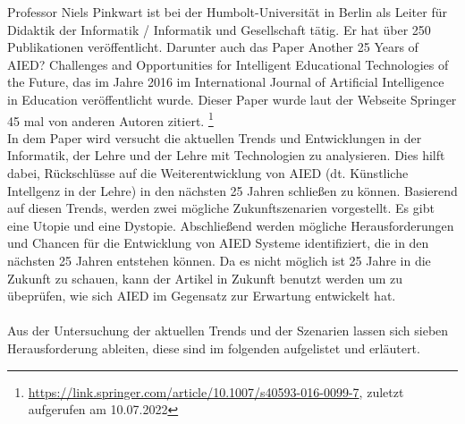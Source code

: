 
Professor Niels Pinkwart ist bei der Humbolt-Universität in Berlin als Leiter für \glqq{}Didaktik der Informatik / Informatik und Gesellschaft\grqq{} tätig.
Er hat über 250 Publikationen veröffentlicht. Darunter auch das Paper \glqq{}Another 25 Years of AIED? Challenges and Opportunities for Intelligent Educational Technologies of the Future\grqq{}, das im Jahre 2016 im \glqq International Journal of Artificial Intelligence in Education\grqq{} veröffentlicht wurde.
Dieser Paper wurde laut der Webseite Springer 45 mal von anderen Autoren zitiert. \footnote{\url{https://link.springer.com/article/10.1007/s40593-016-0099-7}, zuletzt aufgerufen am 10.07.2022}
\\ \noindent
In dem Paper wird versucht die aktuellen Trends und Entwicklungen in der Informatik, der Lehre und der Lehre mit Technologien zu analysieren. Dies hilft dabei, Rückschlüsse auf die Weiterentwicklung
von \ac{AIED} (dt. Künstliche Intellgenz in der Lehre) in den nächsten 25 Jahren schließen zu können. Basierend auf diesen Trends, werden zwei mögliche Zukunftszenarien vorgestellt.
Es gibt eine Utopie und eine Dystopie. Abschließend werden mögliche Herausforderungen und Chancen für die Entwicklung von \ac{AIED} Systeme identifiziert, die in den nächsten 25 Jahren entstehen können.
Da es nicht möglich ist 25 Jahre in die Zukunft zu schauen, kann der Artikel in Zukunft benutzt werden um zu übeprüfen, wie sich \ac{AIED} im Gegensatz zur Erwartung entwickelt hat. \cite[S. 1f]{Pinkwart.2016}
\\ \noindent
\\ \noindent
Aus der Untersuchung der aktuellen Trends und der Szenarien lassen sich sieben Herausforderung ableiten, diese sind im folgenden aufgelistet und erläutert.
